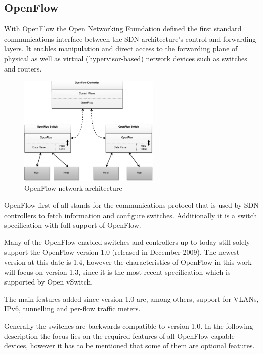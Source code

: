\subsection{OpenFlow}


With OpenFlow the Open Networking Foundation defined the first standard communications interface between the SDN architecture's control and forwarding layers. It enables manipulation and direct access to the forwarding plane of physical as well as virtual (hypervisor-based) network devices such as switches and routers. \cite{onfnewnorm}

\begin{figure}[H]
\centering

\includegraphics[width=0.6\textwidth]{images/fundamentals/openflow_architecture.png}

\caption{OpenFlow network architecture}
\end{figure}

OpenFlow first of all stands for the communications protocol that is used by SDN controllers to fetch information and configure switches. Additionally it is a switch specification with full support of OpenFlow.

Many of the OpenFlow-enabled switches and controllers up to today still solely support the OpenFlow version 1.0 (released in December 2009). The newest version at this date is 1.4, however the characteristics of OpenFlow in this work will focus on version 1.3, since it is the most recent specification which is supported by Open vSwitch.

The main features added since version 1.0 are, among others, support for VLANs, IPv6, tunnelling and per-flow traffic meters. \cite{ofversion13}

Generally the switches are backwards-compatible to version 1.0. In the following description the focus lies on the required features of all OpenFlow capable devices, however it has to be mentioned that some of them are optional features.

